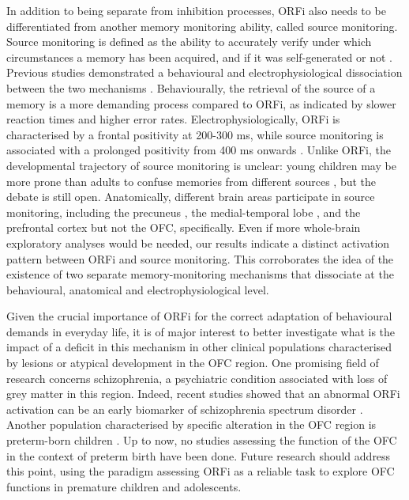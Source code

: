In addition to being separate from inhibition processes, ORFi also needs to be differentiated from another memory monitoring ability, called source monitoring. Source monitoring is defined as the ability to accurately verify under which circumstances a memory has been acquired, and if it was self-generated or not \citep{Mitchell2009}. Previous studies demonstrated a behavioural and electrophysiological dissociation between the two mechanisms  \citep{Bouzerda-Wahlen2015}. Behaviourally, the retrieval of the source of a memory is a more demanding process compared to ORFi, as indicated by slower reaction times and higher error rates. Electrophysiologically, ORFi is characterised by a frontal positivity at 200-300 ms, while source monitoring is associated with a prolonged positivity from 400 ms onwards \citep{Bouzerda-Wahlen2015}. Unlike ORFi, the developmental trajectory of source monitoring is unclear: young children may be more prone than adults to confuse memories from different sources \citep{Lindsay1991}, but the debate is still open. Anatomically, different brain areas participate in source monitoring, including the precuneus \citep{Lundstrom2005}, the medial-temporal lobe \citep{Ross2008}, and the prefrontal cortex \citep{Mitchell2004, Mitchell2009} but not the OFC, specifically. Even if more whole-brain exploratory analyses would be needed, our results indicate a distinct activation pattern between ORFi and source monitoring. This corroborates the idea of the existence of two separate memory-monitoring mechanisms that dissociate at the behavioural, anatomical and electrophysiological level. 

Given the crucial importance of ORFi for the correct adaptation of behavioural demands in everyday life, it is of major interest to better investigate what is the impact of a deficit in this mechanism in other clinical populations characterised by lesions or atypical development in the OFC region. One promising field of research concerns schizophrenia, a psychiatric condition associated with loss of grey matter in this region. Indeed, recent studies showed that an abnormal ORFi activation can be an early biomarker of schizophrenia spectrum disorder \citep{Theze2019}. Another population characterised by specific alteration in the OFC region is preterm-born children \citep{Gimenez2006}. Up to now, no studies assessing the function of the OFC in the context of preterm birth have been done. Future research should address this point, using the paradigm assessing ORFi as a reliable task to explore OFC functions in premature children and adolescents. 

